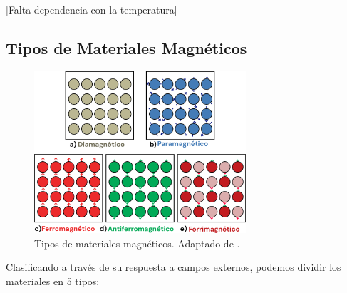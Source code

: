 \documentclass[../main.tex]{subfiles}
\begin{document}
[Falta dependencia con la temperatura]
\subsection{Tipos de Materiales Magnéticos}
\begin{figure}[H]
    \centering
    \includegraphics[width=0.7\textwidth]{fig/types.png}
    \caption{Tipos de materiales magnéticos. Adaptado de \cite{Prasad2023}.}
    \label{diagmaterialesmagneticos}
\end{figure}
Clasificando a través de su respuesta a campos externos, podemos dividir los materiales en 5 tipos:
\end{document}
